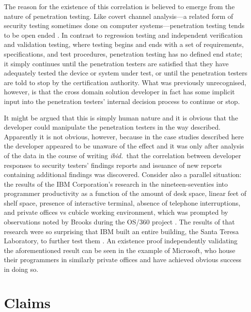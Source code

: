 \documentclass[12pt,letterpaper]{article}
\begin{document}
The reason for the existence of this correlation is believed to emerge from the nature of
penetration testing.  Like covert channel analysis---a related form of security testing
sometimes done on computer systems---penetration testing tends to be open ended
\cite{NCSC-TG-030,Pulugurtha2008}.  In contrast to regression testing and
independent verification and validation testing, where testing begins and ends with a set of
requirements, specifications, and test procedures, penetration testing has no defined end
state; it simply continues until the penetration testers are satisfied that they have adequately
tested the device or system under test, or until the penetration testers are
told to stop by the certification authority.  What was previously unrecognised, however, is
that the cross domain solution developer in fact has some implicit input into the penetration
testers' internal decision process to continue or stop.

It might be argued that this is simply human nature and it is obvious that the developer
could manipulate the penetration testers in the way described.  Apparently it is not obvious,
however, because in the case studies described here \cite[Chapters 4--5]{Loughry2012b} the
developer appeared to be unaware of the effect and it was only after analysis of the data
in the course of writing \emph{ibid.}\ that the correlation between developer responses to
security testers' findings reports and issuance of new reports containing additional findings
was discovered.  Consider also a parallel situation: the results of the IBM Corporation's
research in the nineteen-seventies into programmer productivity as a function of the amount
of desk space, linear feet of shelf space, presence of interactive terminal, absence of
telephone interruptions, and private offices vs cubicle working environment, which was prompted
by observations noted by Brooks during the OS/360 project \cite{Brooks1995}.  The results of
that research were so surprising
that IBM built an entire building, the Santa Teresa Laboratory, to further test them
\cite{DeMarco1999,McCue1978}.  An existence proof independently validating the aforementioned
result can be seen in the example of Microsoft, who house their programmers in similarly
private offices and have achieved obvious success in doing so.

\newpage
\section*{Claims}
\end{document}
